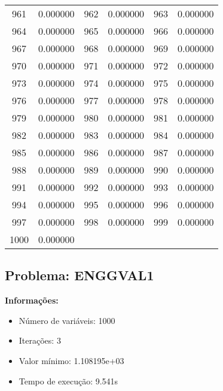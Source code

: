 \documentclass[12pt]{article}
\begin{document}
\begin{longtable}{@{}cc|cc|cc@{}}
961 & 0.000000 & 962 & 0.000000 & 963 & 0.000000 \\
964 & 0.000000 & 965 & 0.000000 & 966 & 0.000000 \\
967 & 0.000000 & 968 & 0.000000 & 969 & 0.000000 \\
970 & 0.000000 & 971 & 0.000000 & 972 & 0.000000 \\
973 & 0.000000 & 974 & 0.000000 & 975 & 0.000000 \\
976 & 0.000000 & 977 & 0.000000 & 978 & 0.000000 \\
979 & 0.000000 & 980 & 0.000000 & 981 & 0.000000 \\
982 & 0.000000 & 983 & 0.000000 & 984 & 0.000000 \\
985 & 0.000000 & 986 & 0.000000 & 987 & 0.000000 \\
988 & 0.000000 & 989 & 0.000000 & 990 & 0.000000 \\
991 & 0.000000 & 992 & 0.000000 & 993 & 0.000000 \\
994 & 0.000000 & 995 & 0.000000 & 996 & 0.000000 \\
997 & 0.000000 & 998 & 0.000000 & 999 & 0.000000 \\
1000 & 0.000000 &  &  &  &  \\

\end{longtable}


\newpage            
\subsection{Problema: ENGGVAL1}

\textbf{Informações:}
\begin{itemize}
\item Número de variáveis: 1000
\item Iterações: 3
\item Valor mínimo: 1.108195e+03
\item Tempo de execução: 9.541s
\end{itemize}
\end{document}
